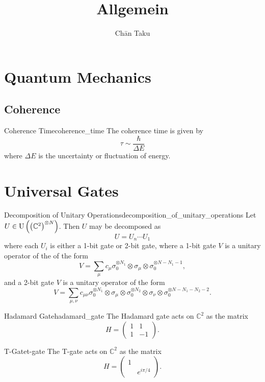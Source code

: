 \documentclass{article}
\title{Allgemein}
\author{Ch\=an Taku}
\begin{document}
\maketitle

\section{Quantum Mechanics}

\subsection{Coherence}

\begin{definition}{Coherence Time}{coherence_time}
    The coherence time is given by
    \[ \tau \sim \frac{\hbar}{\Delta E} \]
    where $\Delta E$ is the uncertainty or fluctuation of energy.
\end{definition}

\section{Universal Gates}

\begin{theorem}{Decomposition of Unitary Operations}{decomposition_of_unitary_operations}
    Let $U \in \operatorname{U}\qty(\qty(\mathbb{C}^2)^{\otimes N})$.
    Then $U$ may be decomposed as
    \[ U = U_n \cdots U_1 \]
    where each $U_i$ is either a 1-bit gate or 2-bit gate,
    where a 1-bit gate $V$ is a unitary operator of the of the form
    \[ V = \sum_\mu c_\mu \sigma_0^{\otimes N_1} \otimes \sigma_\mu \otimes \sigma_0^{\otimes N-N_1-1}, \]
    and a 2-bit gate $V$ is a unitary operator of the form
    \[ V = \sum_{\mu,\nu} c_{\mu\nu} \sigma_0^{\otimes N_1} \otimes \sigma_{\mu} \otimes \sigma_0^{\otimes N_2} \otimes \sigma_{\nu} \otimes \sigma_0^{\otimes N - N_1 - N_2 - 2}. \]
\end{theorem}

\begin{theorem}{Hadamard Gate}{hadamard_gate}
    The Hadamard gate acts on $\mathbb{C}^2$ as the matrix
    \[ H = \begin{pmatrix}
        1 & 1 \\ 1 & -1
    \end{pmatrix}. \]
\end{theorem}

\begin{theorem}{T-Gate}{t-gate}
    The T-gate acts on $\mathbb{C}^2$ as the matrix
    \[ H = \begin{pmatrix}
        1 & \\ & e^{i\pi/4}
    \end{pmatrix}. \]
\end{theorem}
\end{document}
